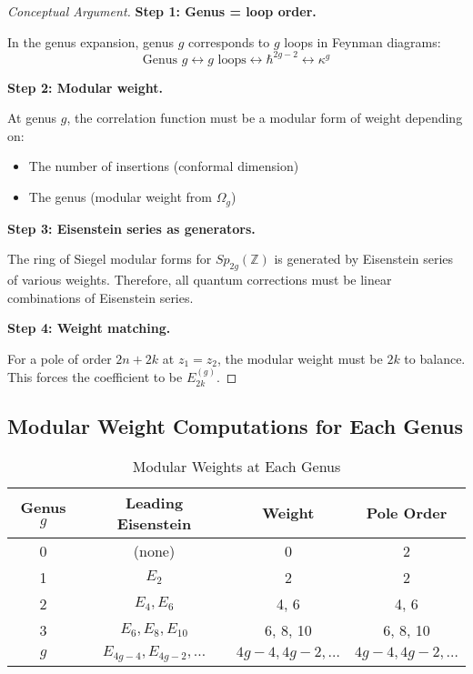 \begin{proof}[Conceptual Argument]

\textbf{Step 1: Genus = loop order.}

In the genus expansion, genus $g$ corresponds to $g$ loops in Feynman diagrams:
$$\text{Genus } g \leftrightarrow g \text{ loops} \leftrightarrow \hbar^{2g-2} 
\leftrightarrow \kappa^g$$

\textbf{Step 2: Modular weight.}

At genus $g$, the correlation function must be a modular form of weight depending on:
\begin{itemize}
\item The number of insertions (conformal dimension)
\item The genus (modular weight from $\Omega_g$)
\end{itemize}

\textbf{Step 3: Eisenstein series as generators.}

The ring of Siegel modular forms for $Sp_{2g}(\mathbb{Z})$ is generated by 
Eisenstein series of various weights. Therefore, all quantum corrections must be 
linear combinations of Eisenstein series.

\textbf{Step 4: Weight matching.}

For a pole of order $2n+2k$ at $z_1 = z_2$, the modular weight must be $2k$ to 
balance. This forces the coefficient to be $E_{2k}^{(g)}$.
\end{proof}

\subsection{Modular Weight Computations for Each Genus}
\label{subsec:modular-weights-all-genus}

\begin{table}[h]
\centering
\caption{Modular Weights at Each Genus}
\label{tab:modular-weights}
\begin{tabular}{|c|c|c|c|}
\hline
\textbf{Genus $g$} & \textbf{Leading Eisenstein} & \textbf{Weight} & 
\textbf{Pole Order} \\
\hline
0 & (none) & 0 & 2 \\
\hline
1 & $E_2$ & 2 & 2 \\
\hline
2 & $E_4, E_6$ & 4, 6 & 4, 6 \\
\hline
3 & $E_6, E_8, E_{10}$ & 6, 8, 10 & 6, 8, 10 \\
\hline
$g$ & $E_{4g-4}, E_{4g-2}, \ldots$ & $4g-4, 4g-2, \ldots$ & $4g-4, 4g-2, \ldots$ \\
\hline
\end{tabular}
\end{table}

